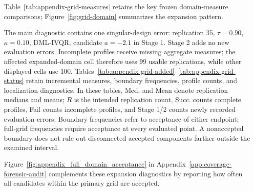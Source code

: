 Table~\ref{tab:appendix-grid-measures} retains the key frozen domain-measure comparisons; Figure~\ref{fig:grid-domain} summarizes the expansion pattern.


The main diagnostic contains one singular-design error: replication 35, $\tau=0.90$, $\kappa=0.10$, DML-IVQR, candidate $a=-2.1$ in Stage 1. Stage 2 adds no new evaluation errors. Incomplete profiles receive missing aggregate measures; the affected expanded-domain cell therefore uses 99 usable replications, while other displayed cells use 100. Tables~\ref{tab:appendix-grid-added}--\ref{tab:appendix-grid-status} retain incremental measures, boundary frequencies, profile counts, and localization diagnostics. In these tables, Med. and Mean denote replication medians and means; $R$ is the intended replication count, Succ. counts complete profiles, Fail counts incomplete profiles, and Stage 1/2 counts newly recorded evaluation errors. Boundary frequencies refer to acceptance of either endpoint; full-grid frequencies require acceptance at every evaluated point. A nonaccepted boundary does not rule out disconnected accepted components farther outside the examined interval.


\FloatBarrier

Figure~\ref{fig:appendix_full_domain_acceptance} in Appendix~\ref{app:coverage-forensic-audit} complements these expansion diagnostics by reporting how often all candidates within the primary grid are accepted.
\Needspace{7\baselinedist}
